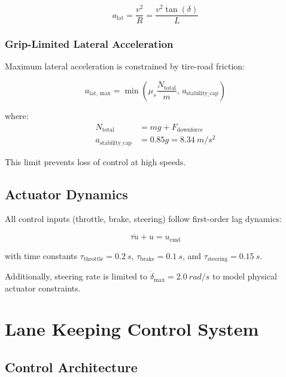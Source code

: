\documentclass[11pt,a4paper]{article}
\begin{document}
\begin{equation}
a_{\text{lat}} = \frac{v^2}{R} = \frac{v^2 \tan(\delta)}{L}
\end{equation}

\subsubsection{Grip-Limited Lateral Acceleration}

Maximum lateral acceleration is constrained by tire-road friction:

\begin{equation}
a_{\text{lat, max}} = \min\left(\mu_s \frac{N_{\text{total}}}{m}, \, a_{\text{stability\_cap}}\right)
\end{equation}

where:
\begin{align}
N_{\text{total}} &= mg + F_{\text{downforce}} \\
a_{\text{stability\_cap}} &= 0.85g = \SI{8.34}{m/s^2}
\end{align}

This limit prevents loss of control at high speeds.

\subsection{Actuator Dynamics}

All control inputs (throttle, brake, steering) follow first-order lag dynamics:

\begin{equation}
\tau \dot{u} + u = u_{\text{cmd}}
\end{equation}

with time constants $\tau_{\text{throttle}} = \SI{0.2}{s}$, $\tau_{\text{brake}} = \SI{0.1}{s}$, and $\tau_{\text{steering}} = \SI{0.15}{s}$.

Additionally, steering rate is limited to $\dot{\delta}_{\text{max}} = \SI{2.0}{rad/s}$ to model physical actuator constraints.

\section{Lane Keeping Control System}

\subsection{Control Architecture}
\end{document}
